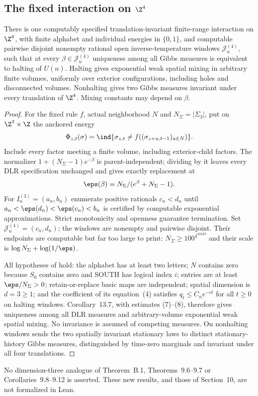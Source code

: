 \subsection{The fixed interaction on $\Z^4$}

\begin{corollary}\label{cor:three-gibbs}
There is one computably specified translation-invariant finite-range interaction on $\Z^4$, with finite alphabet and individual energies in $\{0,1\}$, and computable pairwise disjoint nonempty rational open inverse-temperature windows $\mathcal J_n^{(4)}$, such that at every $\beta\in\mathcal J_n^{(4)}$ uniqueness among all Gibbs measures is equivalent to halting of $U(n)$. Halting gives exponential weak spatial mixing in arbitrary finite volumes, uniformly over exterior configurations, including holes and disconnected volumes. Nonhalting gives two Gibbs measures invariant under every translation of $\Z^4$. Mixing constants may depend on $\beta$.
\end{corollary}
\begin{proof}
For the fixed rule $f$, actual neighborhood $N$ and $N_\Sigma=|\Sigma_3|$, put on $\Z^3\times\Z$ the anchored energy
\[
 \Phi_{z,t}(\sigma)=\ind\{\sigma_{z,t}\ne f((\sigma_{z+u,t-1})_{u\in N})\}.
\]
Include every factor meeting a finite volume, including exterior-child factors. The normalizer $1+(N_\Sigma-1)e^{-\beta}$ is parent-independent; dividing by it leaves every DLR specification unchanged and gives exactly replacement at
\[
 \eps(\beta)=N_\Sigma/(e^\beta+N_\Sigma-1).
\]
For $I_n^{(3)}=(a_n,b_n)$ enumerate positive rationals $c_n<d_n$ until $a_n<\eps(d_n)<\eps(c_n)<b_n$ is certified by computable exponential approximations. Strict monotonicity and openness guarantee termination. Set $\mathcal J_n^{(4)}=(c_n,d_n)$; the windows are nonempty and pairwise disjoint. Their endpoints are computable but far too large to print: $N_\Sigma\ge100^{4^{43429}}$ and their scale is $\log N_\Sigma+\log(1/\eps)$.

All hypotheses of \cite[Section~2.1 and Corollary~13.7]{DMst} hold: the alphabet has at least two letters; $N$ contains zero because $S_0$ contains zero and SOUTH has logical index $i$; entries are at least $\eps/N_\Sigma>0$; retain-or-replace basic maps are independent; spatial dimension is $d=3\ge1$; and the coefficient of its equation~(4) satisfies $q_t\le C_ne^{-ct}$ for all $t\ge0$ on halting windows. Corollary~13.7, with estimates (7)--(8), therefore gives uniqueness among all DLR measures and arbitrary-volume exponential weak spatial mixing. No invariance is assumed of competing measures. On nonhalting windows \cite[Lemma~2.4]{DMst} sends the two spatially invariant stationary laws to distinct stationary-history Gibbs measures, distinguished by time-zero marginals and invariant under all four translations.
\end{proof}

No dimension-three analogue of Theorem~B.1, Theorems~9.6--9.7 or Corollaries~9.8--9.12 is asserted. These new results, and those of Section~10, are not formalized in Lean.
